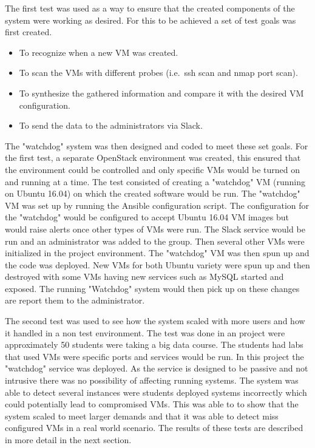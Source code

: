 \documentclass[12pt]{article}
\begin{document}
The first test was used as a way to ensure that the created components of the system were working as desired. For this to be achieved a set of test goals was first created.

\begin{itemize}
    \item To recognize when a new VM was created.
    \item To scan the VMs with different probes (i.e.\ ssh scan and nmap port scan).
    \item To synthesize the gathered information and compare it with the desired VM configuration.
    \item To send the data to the administrators via Slack.
\end{itemize}

The "watchdog" system was then designed and coded to meet these set goals. For the first test, a separate OpenStack environment was created, this ensured that the environment could be controlled and only specific VMs would be turned on and running at a time. The test consisted of creating a "watchdog" VM (running on Ubuntu 16.04) on which the created software would be run. The "watchdog" VM was set up by running the Ansible configuration script. The configuration for the "watchdog" would be configured to accept Ubuntu 16.04 VM images but would raise alerts once other types of VMs were run. The Slack service would be run and an administrator was added to the group. Then several other VMs were initialized in the project environment. The "watchdog" VM was then spun up and the code was deployed. New VMs for both Ubuntu variety were spun up and then destroyed with some VMs having new services such as MySQL started and exposed. The running "Watchdog" system would then pick up on these changes are report them to the administrator.

The second test was used to see how the system scaled with more users and how it handled in a non test environment. The test was done in an project were approximately 50 students were taking a big data course. The students had labs that used VMs were specific ports and services would be run. In this project the "watchdog" service was deployed. As the service is designed to be passive and not intrusive there was no possibility of affecting running systems. The system was able to detect several instances were students deployed systems incorrectly which could potentially lead to compromised VMs. This was able to to show that the system scaled to meet larger demands and that it was able to detect miss configured VMs in a real world scenario. The results of these tests are described in more detail in the next section.
\end{document}
